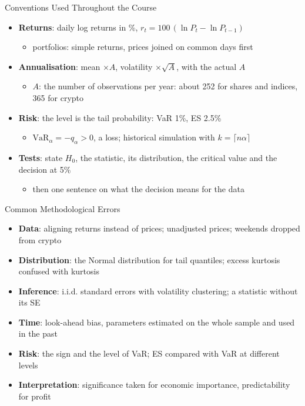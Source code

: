\begin{frame}{Conventions Used Throughout the Course}
\itemsize{\small}
\begin{itemize}
    \item \textbf{Returns}: daily log returns in \%, $r_t = 100\,(\ln P_t - \ln P_{t-1})$
    \begin{itemize}
        \item portfolios: simple returns, prices joined on common days first
    \end{itemize}
    \item \textbf{Annualisation}: mean $\times A$, volatility $\times\sqrt{A}$, with the actual $A$
    \begin{itemize}
        \item $A$: the number of observations per year: about 252 for shares and indices, 365 for crypto
    \end{itemize}
    \item \textbf{Risk}: the level is the tail probability: VaR 1\%, ES 2.5\%
    \begin{itemize}
        \item $\mathrm{VaR}_\alpha = -q_\alpha > 0$, a loss; historical simulation with $k = \lceil n\alpha \rceil$
    \end{itemize}
    \item \textbf{Tests}: state $H_0$, the statistic, its distribution, the critical value and the decision at 5\%
    \begin{itemize}
        \item then one sentence on what the decision means for the data
    \end{itemize}
\end{itemize}
\end{frame}

\begin{frame}{Common Methodological Errors}
\itemsize{\small}
\begin{itemize}
    \item \textbf{Data}: aligning returns instead of prices; unadjusted prices; weekends dropped from crypto
    \item \textbf{Distribution}: the Normal distribution for tail quantiles; excess kurtosis confused with kurtosis
    \item \textbf{Inference}: i.i.d. standard errors with volatility clustering; a statistic without its SE
    \item \textbf{Time}: look-ahead bias, parameters estimated on the whole sample and used in the past
    \item \textbf{Risk}: the sign and the level of VaR; ES compared with VaR at different levels
    \item \textbf{Interpretation}: significance taken for economic importance, predictability for profit
\end{itemize}
\end{frame}



